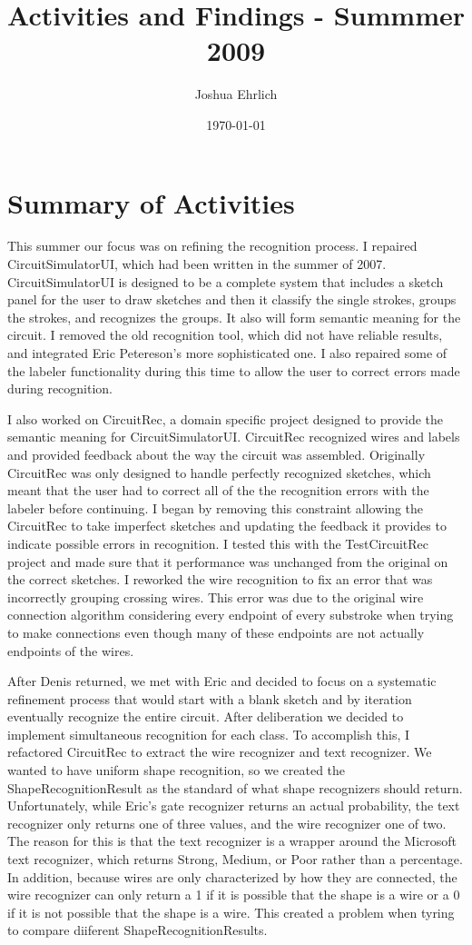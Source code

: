\documentclass{article}
\title{Activities and Findings - Summmer 2009}
\author{Joshua Ehrlich}
\date{\today}
\begin{document}
\maketitle

\section{Summary of Activities}
This summer our focus was on refining the recognition process.  I repaired CircuitSimulatorUI, which had been written in the summer of 2007.  CircuitSimulatorUI is designed to be a complete system that includes a sketch panel for the user to draw sketches and then it classify the single strokes, groups the strokes, and recognizes the groups.  It also will form semantic meaning for the circuit.  I removed the old recognition tool, which did not have reliable results, and integrated Eric Petereson's more sophisticated one.  I also repaired some of the labeler functionality during this time to allow the user to correct errors made during recognition.

I also worked on CircuitRec, a domain specific project designed to provide the semantic meaning for CircuitSimulatorUI.  CircuitRec recognized wires and labels and provided feedback about the way the circuit was assembled.  Originally CircuitRec was only designed to handle perfectly recognized sketches, which meant that the user had to correct all of the the recognition errors with the labeler before continuing.  I began by removing this constraint allowing the CircuitRec to take imperfect sketches and updating the feedback it provides to indicate possible errors in recognition.  I tested this with the TestCircuitRec project and made sure that it performance was unchanged from the original on the correct sketches.  I reworked the wire recognition to fix an error that was incorrectly grouping crossing wires.  This error was due to the original wire connection algorithm considering every endpoint of every substroke when trying to make connections even though many of these endpoints are not actually endpoints of the wires.

After Denis returned, we met with Eric and decided to focus on a systematic refinement process that would start with a blank sketch and by iteration eventually recognize the entire circuit.  After deliberation we decided to implement simultaneous recognition for each class.  To accomplish this, I refactored CircuitRec to extract the wire recognizer and text recognizer.   We wanted to have uniform shape recognition, so we created the ShapeRecognitionResult as the standard of what shape recognizers should return.  Unfortunately, while Eric's gate recognizer returns an actual probability, the text recognizer only returns one of three values, and the wire recognizer one of two.  The reason for this is that the text recognizer is a wrapper around the Microsoft text recognizer, which returns Strong, Medium, or Poor rather than a percentage.  In addition, because wires are only characterized by how they are connected, the wire recognizer can only return a 1 if it is possible that the shape is a wire or a 0 if it is not possible that the shape is a wire.    This created a problem when tyring to compare diiferent ShapeRecognitionResults.
\end{document}
